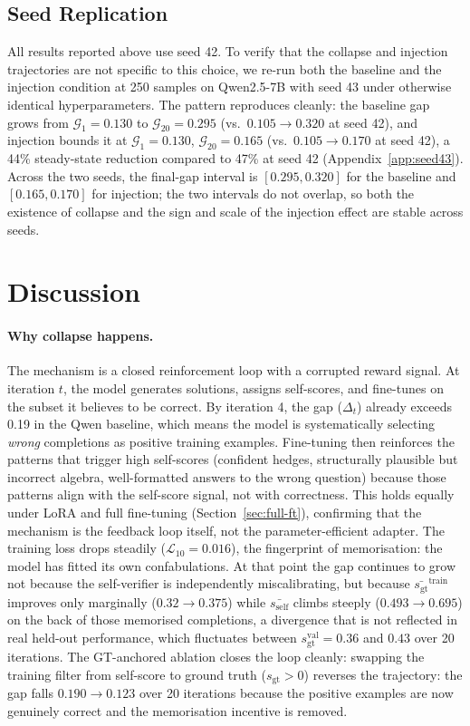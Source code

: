 \documentclass{article}
\newcommand{\gap}{\mathcal{G}}          %
\newcommand{\self}{s_{\text{self}}}     %
\newcommand{\gt}{s_{\text{gt}}}         %
\begin{document}
\subsection{Seed Replication}
\label{sec:seed-replication}

All results reported above use seed 42.
To verify that the collapse and injection trajectories are not specific to this
choice, we re-run both the baseline and the injection condition at
250 samples on Qwen2.5-7B with seed 43 under otherwise identical hyperparameters.
The pattern reproduces cleanly: the baseline gap grows from
$\gap_1 = 0.130$ to $\gap_{20} = 0.295$ (vs.\ $0.105 \to 0.320$ at seed 42),
and injection bounds it at $\gap_1 = 0.130$, $\gap_{20} = 0.165$
(vs.\ $0.105 \to 0.170$ at seed 42), a 44\% steady-state reduction compared
to 47\% at seed 42 (Appendix~\ref{app:seed43}).
Across the two seeds, the final-gap interval is $[0.295, 0.320]$ for
the baseline and $[0.165, 0.170]$ for injection; the two intervals do not
overlap, so both the existence of collapse and the sign and scale of the
injection effect are stable across seeds.

\section{Discussion}
\label{sec:discussion}

\paragraph{Why collapse happens.}
The mechanism is a closed reinforcement loop with a corrupted reward signal.
At iteration $t$, the model generates solutions, assigns self-scores, and
fine-tunes on the subset it believes to be correct.
By iteration 4, the gap ($\Delta_t$) already exceeds 0.19 in the Qwen baseline,
which means the model is systematically selecting \emph{wrong} completions
as positive training examples.
Fine-tuning then reinforces the patterns that trigger high
self-scores (confident hedges, structurally plausible but incorrect
algebra, well-formatted answers to the wrong question) because those
patterns align with the self-score signal, not with correctness.
This holds equally under LoRA and full fine-tuning
(Section~\ref{sec:full-ft}), confirming that the mechanism is the
feedback loop itself, not the parameter-efficient adapter.
The training loss drops steadily ($\mathcal{L}_{10} = 0.016$),
the fingerprint of memorisation: the model has fitted its own
confabulations.
At that point the gap continues to grow not because the self-verifier is
independently miscalibrating, but because $\bar{\gt}^\text{train}$ improves
only marginally ($0.32 \to 0.375$) while $\bar{\self}$ climbs steeply
($0.493 \to 0.695$) on the back of those memorised completions, a
divergence that is not reflected in real held-out performance, which
fluctuates between $\gt^\text{val} = 0.36$ and $0.43$ over 20 iterations.
The GT-anchored ablation closes the loop cleanly: swapping the training filter
from self-score to ground truth ($\gt > 0$) reverses the
trajectory: the gap falls $0.190 \to 0.123$ over 20 iterations because
the positive examples are now genuinely correct and the memorisation
incentive is removed.
\end{document}
